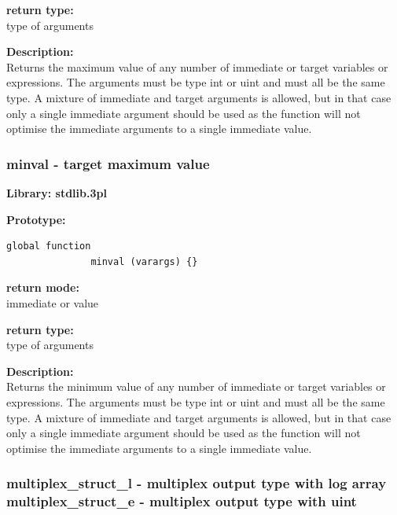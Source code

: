             {\bf return type:} \\
            type of arguments

            {\bf Description:} \\
            Returns the maximum value of any number of immediate or target
            variables or expressions. The arguments must be type int or uint and
            must all be the same type. A mixture of immediate and target
            arguments is allowed, but in that case only a single immediate
            argument should be used as the function will not optimise the
            immediate arguments to a single immediate value.            


        \subsubsection{minval - target maximum value}\label{sec:lfminval}

            {\bf Library: stdlib.3pl}

            {\bf Prototype:} \\
            \vsp
            \begin{lstlisting}[gobble=12, language=threepl]
               global function
               minval (varargs) {}
            \end{lstlisting}

            {\bf return mode:} \\
            immediate or value

            {\bf return type:} \\
            type of arguments

            {\bf Description:} \\
            Returns the minimum value of any number of immediate or target
            variables or expressions. The arguments must be type int or uint and
            must all be the same type. A mixture of immediate and target
            arguments is allowed, but in that case only a single immediate
            argument should be used as the function will not optimise the
            immediate arguments to a single immediate value.            



        \subsubsection{multiplex\_struct\_l - multiplex output type with log array\\
                    multiplex\_struct\_e - multiplex output type with uint}\label{sec:lfmultiplexstruct}

